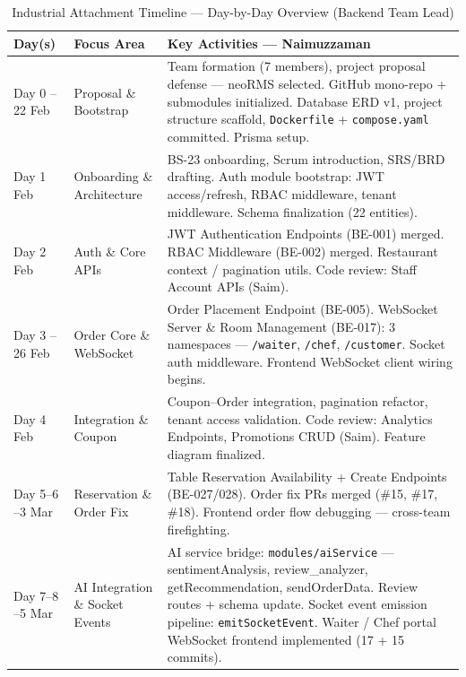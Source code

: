 \begin{table}[H]
\centering
\small
\caption{Industrial Attachment Timeline --- Day-by-Day Overview (Backend Team Lead)}
\label{tab:timeline}
\begin{tabularx}{\textwidth}{@{}p{}p{}X@{}}
\toprule
\textbf{Day(s)} & \textbf{Focus Area} & \textbf{Key Activities --- Naimuzzaman} \\
\midrule
Day 0 \newline 20--22 Feb & Proposal \& Bootstrap & Team formation (7 members), project proposal defense --- neoRMS selected. GitHub mono-repo + submodules initialized. Database ERD v1, project structure scaffold, \texttt{Dockerfile} + \texttt{compose.yaml} committed. Prisma setup. \\
Day 1 \newline 23 Feb & Onboarding \& Architecture & BS-23 onboarding, Scrum introduction, SRS/BRD drafting. Auth module bootstrap: JWT access/refresh, RBAC middleware, tenant middleware. Schema finalization (22 entities). \\
Day 2 \newline 24 Feb & Auth \& Core APIs & JWT Authentication Endpoints (BE-001) merged. RBAC Middleware (BE-002) merged. Restaurant context / pagination utils. Code review: Staff Account APIs (Saim). \\
Day 3 \newline 25--26 Feb & Order Core \& WebSocket & Order Placement Endpoint (BE-005). WebSocket Server \& Room Management (BE-017): 3 namespaces --- \texttt{/waiter}, \texttt{/chef}, \texttt{/customer}. Socket auth middleware. Frontend WebSocket client wiring begins. \\
Day 4 \newline 27 Feb & Integration \& Coupon & Coupon--Order integration, pagination refactor, tenant access validation. Code review: Analytics Endpoints, Promotions CRUD (Saim). Feature diagram finalized. \\
Day 5--6 \newline 2--3 Mar & Reservation \& Order Fix & Table Reservation Availability + Create Endpoints (BE-027/028). Order fix PRs merged (\#15, \#17, \#18). Frontend order flow debugging --- cross-team firefighting. \\
Day 7--8 \newline 4--5 Mar & AI Integration \& Socket Events & AI service bridge: \texttt{modules/aiService} --- sentimentAnalysis, review\_analyzer, getRecommendation, sendOrderData. Review routes + schema update. Socket event emission pipeline: \texttt{emitSocketEvent}. Waiter / Chef portal WebSocket frontend implemented (17 + 15 commits). \\

\end{tabularx}
\end{table}
